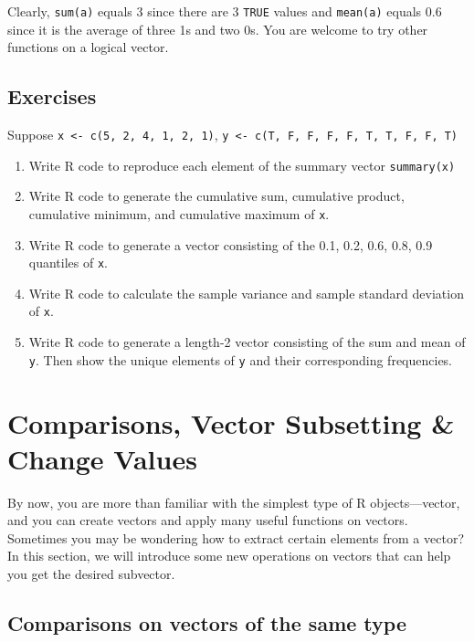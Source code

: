 \documentclass[
]{book}
\begin{document}
Clearly, \texttt{sum(a)} equals 3 since there are 3 \texttt{TRUE} values and \texttt{mean(a)} equals 0.6 since it is the average of three 1s and two 0s. You are welcome to try other functions on a logical vector.

\hypertarget{exercises-7}{%
\subsection{Exercises}\label{exercises-7}}

Suppose \texttt{x\ \textless{}-\ c(5,\ 2,\ 4,\ 1,\ 2,\ 1)}, \texttt{y\ \textless{}-\ c(T,\ F,\ F,\ F,\ F,\ T,\ T,\ F,\ F,\ T)}

\begin{enumerate}
\def\labelenumi{\arabic{enumi}.}
\item
  Write R code to reproduce each element of the summary vector \texttt{summary(x)}
\item
  Write R code to generate the cumulative sum, cumulative product, cumulative minimum, and cumulative maximum of \texttt{x}.
\item
  Write R code to generate a vector consisting of the 0.1, 0.2, 0.6, 0.8, 0.9 quantiles of \texttt{x}.
\item
  Write R code to calculate the sample variance and sample standard deviation of \texttt{x}.
\item
  Write R code to generate a length-2 vector consisting of the sum and mean of \texttt{y}. Then show the unique elements of \texttt{y} and their corresponding frequencies.
\end{enumerate}

\hypertarget{comparison-vector-subsetting}{%
\section{Comparisons, Vector Subsetting \& Change Values}\label{comparison-vector-subsetting}}

By now, you are more than familiar with the simplest type of R objects---vector, and you can create vectors and apply many useful functions on vectors. Sometimes you may be wondering how to extract certain elements from a vector? In this section, we will introduce some new operations on vectors that can help you get the desired subvector.

\hypertarget{comparisons-on-vectors-of-the-same-type}{%
\subsection{Comparisons on vectors of the same type}\label{comparisons-on-vectors-of-the-same-type}}
\end{document}
